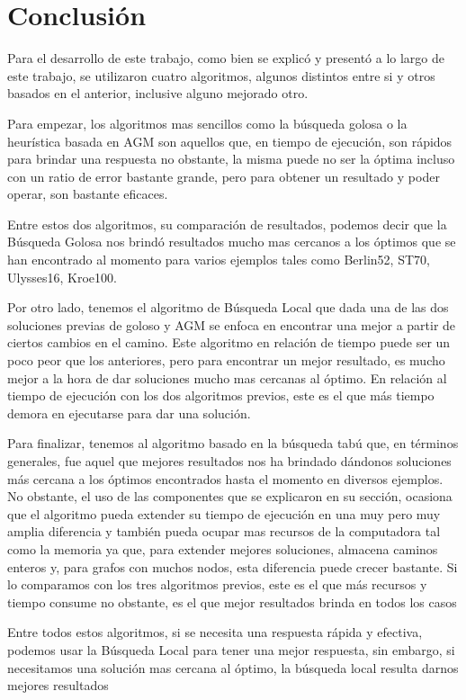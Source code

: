\documentclass[10pt,a4paper]{article}
\begin{document}
\section{Conclusión}

Para el desarrollo de este trabajo, como bien se explicó y presentó a lo largo de este trabajo, se utilizaron cuatro algoritmos, algunos distintos entre si y otros basados en el anterior, inclusive alguno mejorado otro.

Para empezar, los algoritmos mas sencillos como la búsqueda golosa o la heurística basada en AGM son aquellos que, en tiempo de ejecución, son rápidos para brindar una respuesta no obstante, la misma puede no ser la óptima incluso con un ratio de error bastante grande, pero para obtener un resultado y poder operar, son bastante eficaces.

Entre estos dos algoritmos, su comparación de resultados, podemos decir que la Búsqueda Golosa nos brindó resultados mucho mas cercanos a los óptimos que se han encontrado al momento para varios ejemplos tales como Berlin52, ST70, Ulysses16, Kroe100.

Por otro lado, tenemos el algoritmo de Búsqueda Local que dada una de las dos soluciones previas de goloso y AGM se enfoca en encontrar una mejor a partir de ciertos cambios en el camino. Este algoritmo en relación de tiempo puede ser un poco peor que los anteriores, pero para encontrar un mejor resultado, es mucho mejor a la hora de dar soluciones mucho mas cercanas al óptimo. En relación al tiempo de ejecución con los dos algoritmos previos, este es el que más tiempo demora en ejecutarse para dar una solución.

Para finalizar, tenemos al algoritmo basado en la búsqueda tabú que, en términos generales, fue aquel que mejores resultados nos ha brindado dándonos soluciones más cercana a los óptimos encontrados hasta el momento en diversos ejemplos. No obstante, el uso de las componentes que se explicaron en su sección, ocasiona que el algoritmo pueda extender su tiempo de ejecución en una muy pero muy amplia diferencia y también pueda ocupar mas recursos de la computadora tal como la memoria ya que, para extender mejores soluciones, almacena caminos enteros y, para grafos con muchos nodos, esta diferencia puede crecer bastante.
Si lo comparamos con los tres algoritmos previos, este es el que más recursos y tiempo consume no obstante, es el que mejor resultados brinda en todos los casos

Entre todos estos algoritmos, si se necesita una respuesta rápida y efectiva, podemos usar la Búsqueda Local para tener una mejor respuesta, sin embargo, si necesitamos una solución mas cercana al óptimo, la búsqueda local resulta darnos mejores resultados
\end{document}
